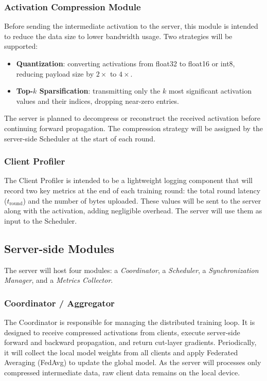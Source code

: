 \documentclass[conference]{IEEEtran}
\begin{document}
\subsubsection{Activation Compression Module}

Before sending the intermediate activation to the server, this module is intended to reduce the data size to lower bandwidth usage. Two strategies will be supported:
\begin{itemize}
  \item \textbf{Quantization}: converting activations from float32 to float16 or int8, reducing payload size by $2\times$ to $4\times$.
  \item \textbf{Top-$k$ Sparsification}: transmitting only the $k$ most significant activation values and their indices, dropping near-zero entries.
\end{itemize}
The server is planned to decompress or reconstruct the received activation before continuing forward propagation. The compression strategy will be assigned by the server-side Scheduler at the start of each round.

\subsubsection{Client Profiler}

The Client Profiler is intended to be a lightweight logging component that will record two key metrics at the end of each training round: the total round latency ($t_{\mathrm{round}}$) and the number of bytes uploaded. These values will be sent to the server along with the activation, adding negligible overhead. The server will use them as input to the Scheduler.

\subsection{Server-side Modules}
\label{sec:server_modules}

The server will host four modules: a \textit{Coordinator}, a \textit{Scheduler}, a \textit{Synchronization Manager}, and a \textit{Metrics Collector}.

\subsubsection{Coordinator / Aggregator}

The Coordinator is responsible for managing the distributed training loop. It is designed to receive compressed activations from clients, execute server-side forward and backward propagation, and return cut-layer gradients. Periodically, it will collect the local model weights from all clients and apply Federated Averaging (FedAvg) to update the global model. As the server will processes only compressed intermediate data, raw client data remains on the local device.
\end{document}
